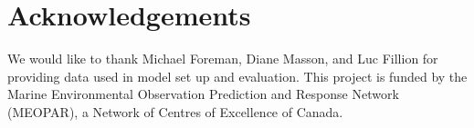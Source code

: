 \documentclass[pdftex,10pt]{article}
\begin{document}
\section{Acknowledgements}\label{sec:ack}
We would like to thank Michael Foreman, Diane Masson, and Luc Fillion for providing data used in model set up and evaluation. This project is funded by the Marine Environmental Observation Prediction and Response Network (MEOPAR), a Network of Centres of Excellence of Canada.  



\end{document}
